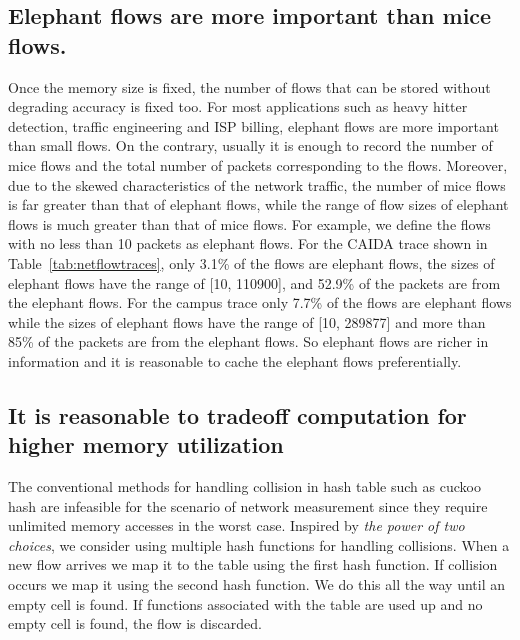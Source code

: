 \subsection{Elephant flows are more important than mice flows.}
Once the memory size is fixed, the number of flows that can be stored without degrading accuracy is fixed too. For most applications such as heavy hitter detection, traffic engineering and ISP billing, elephant flows are more important than small flows. On the contrary, usually it is enough to record the number of mice flows and the total number of packets corresponding to the flows. Moreover, due to the skewed characteristics of the network traffic\cite{benson_network_2010}, the number of mice flows is far greater than that of elephant flows, while the range of flow sizes of elephant flows is much greater than that of mice flows. For example, we define the flows with no less than 10 packets as elephant flows. For the CAIDA trace shown in Table~\ref{tab:netflowtraces},  only 3.1\% of the flows are elephant flows, the sizes of elephant flows have the range of [10, 110900], and 52.9\% of the packets are from the elephant flows. For the campus trace only 7.7\% of the flows are elephant flows while the sizes of elephant flows have the range of [10, 289877] and more than 85\% of the packets are from the elephant flows. So elephant flows are richer in information and it is reasonable to cache the elephant flows preferentially. 


\subsection{It is reasonable to tradeoff computation for higher memory utilization}
\label{subsection:computationmemoryutilizationtradeoff}
The conventional methods for handling collision in hash table such as cuckoo hash\cite{pagh_cuckoo_2004}\cite{chen_dynamic_2017} are infeasible for the scenario of network measurement since they require unlimited memory accesses in the worst case. Inspired by \emph{the power of two choices}\cite{byers_geometric_2004}\cite{doerr_stabilizing_2011}\cite{mitzenmacher_using_2007}\cite{mitzenmacher_power_2001}, we consider using multiple hash functions for handling collisions. When a new flow arrives we map it to the table using the first hash function. If collision occurs we map it using the second hash function. We do this all the way until an empty cell is found. If functions associated with the table are used up and no empty cell is found, the flow is discarded. 

